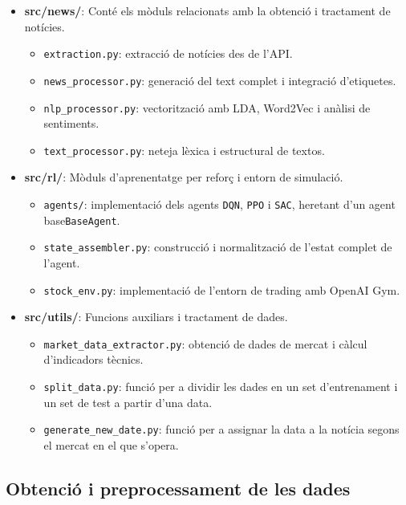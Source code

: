 \documentclass[12pt,a4paper,twoside]{book}
\begin{document}
\begin{itemize}
    \item \textbf{src/news/}: Conté els mòduls relacionats amb la obtenció i tractament de notícies.
    \begin{itemize}
        \item \texttt{extraction.py}: extracció de notícies des de l'API.
        \item \texttt{news\_processor.py}: generació del text complet i integració d'etiquetes.
        \item \texttt{nlp\_processor.py}: vectorització amb LDA, Word2Vec i anàlisi de sentiments.
        \item \texttt{text\_processor.py}: neteja lèxica i estructural de textos.
    \end{itemize}

    \item \textbf{src/rl/}: Mòduls d'aprenentatge per reforç i entorn de simulació.
    \begin{itemize}
        \item \texttt{agents/}: implementació dels agents \texttt{DQN}, \texttt{PPO} i \texttt{SAC}, heretant d'un agent base\texttt{BaseAgent}.
        \item \texttt{state\_assembler.py}: construcció i normalització de l'estat complet de l'agent.
        \item \texttt{stock\_env.py}: implementació de l'entorn de trading amb OpenAI Gym.
    \end{itemize}

    \item \textbf{src/utils/}: Funcions auxiliars i tractament de dades.
    \begin{itemize}
        \item \texttt{market\_data\_extractor.py}: obtenció de dades de mercat i càlcul d'indicadors tècnics.
        \item \texttt{split\_data.py}: funció per a dividir les dades en un set d'entrenament i un set de test a partir d'una data.
        \item \texttt{generate\_new\_date.py}: funció per a assignar la data a la notícia segons el mercat en el que s'opera.
    \end{itemize}
\end{itemize}

\subsection{Obtenció i preprocessament de les dades}
\end{document}
